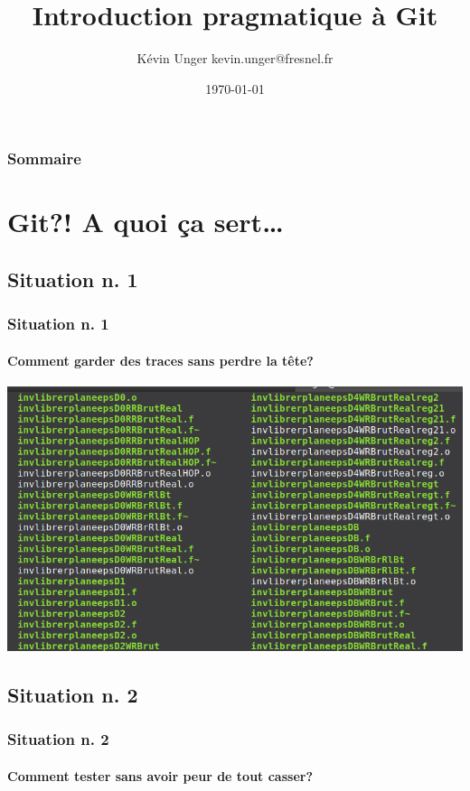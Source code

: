 \documentclass[t,11pt]{beamer}
\title{Introduction pragmatique à Git}
\author{K\'evin Unger\hspace{1mm} \newline kevin.unger@fresnel.fr}
\institute
{
        Institut Fresnel\\
        \url{https://github.com/kevung/git-presentation.git}
}
\date{\today}
\begin{document}
\begin{frame}[plain,c]
        \titlepage
\end{frame}

\begin{frame}[c]
        \frametitle{Sommaire}
        \tableofcontents[hideallsubsections]
\end{frame}


\section{Git?! A quoi ça sert\ldots}


\subsection{Situation n. 1}
\begin{frame}[label=sit1]
        \frametitle{Situation n. 1}
        \framesubtitle{Comment garder des traces sans perdre la tête?}
        \includegraphics[width=\linewidth]{./img/bazar_crop2}
\end{frame}


\subsection{Situation n. 2}
\begin{frame}[label=sit2]
        \frametitle{Situation n. 2}
        \framesubtitle{Comment tester sans avoir peur de tout casser?}
\end{frame}
\end{document}
